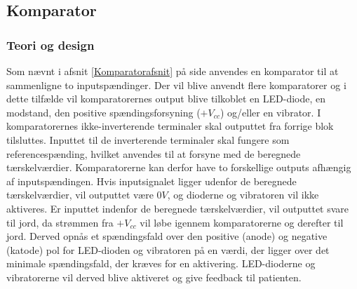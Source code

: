 \subsection{Komparator}
\subsubsection{Teori og design}
Som nævnt i afsnit \ref{Komparatorafsnit} på side \pageref{Komparatorafsnit} anvendes en komparator til at sammenligne to inputspændinger. Der vil blive anvendt flere komparatorer og i dette tilfælde vil komparatorernes output blive tilkoblet en LED-diode, en modstand, den positive spændingsforsyning ($+V_{cc}$) og/eller en vibrator. I komparatorernes ikke-inverterende terminaler skal outputtet fra forrige blok tilsluttes. Inputtet til de inverterende terminaler skal fungere som referencespænding, hvilket anvendes til at forsyne med de beregnede tærskelværdier. Komparatorerne kan derfor have to forskellige outputs afhængig af inputspændingen. Hvis inputsignalet ligger udenfor de beregnede tærskelværdier, vil outputtet være $0V$, og dioderne og vibratoren vil ikke aktiveres. Er inputtet indenfor de beregnede tærskelværdier, vil outputtet svare til jord, da strømmen fra $+V_{cc}$ vil løbe igennem komparatorerne og derefter til jord. Derved opnås et spændingsfald over den positive (anode) og negative (katode) pol for LED-dioden og vibratoren på en værdi, der ligger over det minimale spændingsfald, der kræves for en aktivering. LED-dioderne og vibratorerne vil derved blive aktiveret og give feedback til patienten. \\

